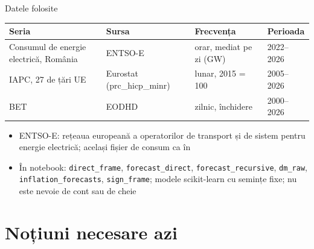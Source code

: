 \begin{frame}{Datele folosite}
\itemsize{\small}
\begin{center}
\footnotesize
\begin{tabular}{llll}
\toprule
\textbf{Seria} & \textbf{Sursa} & \textbf{Frecvența} & \textbf{Perioada} \\
\midrule
Consumul de energie electrică, România & ENTSO-E & orar, mediat pe zi (GW) & 2022--2026 \\
IAPC, 27 de țări UE & Eurostat (prc\_hicp\_minr) & lunar, 2015 = 100 & 2005--2026 \\
BET & EODHD & zilnic, închidere & 2000--2026 \\
\bottomrule
\end{tabular}
\end{center}
\begin{itemize}
    \item ENTSO-E: rețeaua europeană a operatorilor de transport și de sistem pentru energie electrică; același fișier de consum ca în 
    \item În notebook: \texttt{direct\_frame}, \texttt{forecast\_direct}, \texttt{forecast\_recursive}, \texttt{dm\_raw}, \texttt{inflation\_forecasts}, \texttt{sign\_frame}; modele scikit-learn cu semințe fixe; nu este nevoie de cont sau de cheie
\end{itemize}
\end{frame}


\section{Noțiuni necesare azi}

